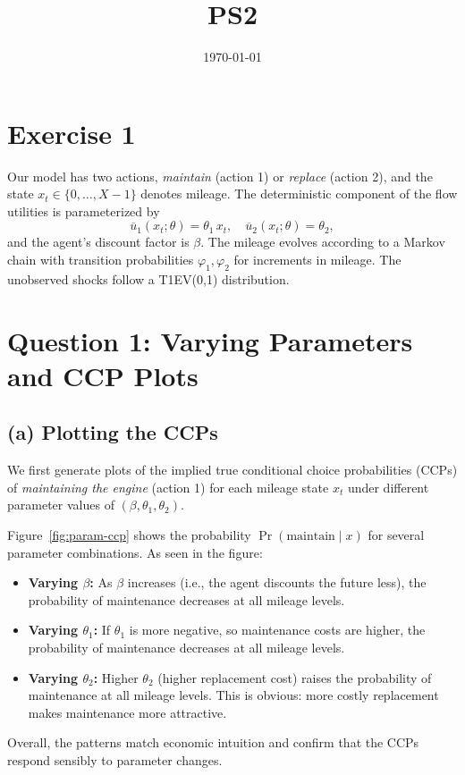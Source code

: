 \documentclass[12pt]{article}
\title{PS2}
\date{\today}
\begin{document}
\maketitle

\section{Exercise 1}
Our model has two actions, \emph{maintain} (action 1) or \emph{replace} (action 2), and the state $x_t \in \{0,\ldots,X-1\}$ denotes mileage. The deterministic component of the flow utilities is parameterized by
\[
\overline{u}_1(x_t;\theta) = \theta_1 \, x_t, 
\quad
\overline{u}_2(x_t;\theta) = \theta_2,
\]
and the agent’s discount factor is $\beta$. The mileage evolves according to a Markov chain with transition probabilities $\varphi_1,\varphi_2$ for increments in mileage. The unobserved shocks follow a T1EV(0,1) distribution.

\section{Question 1: Varying Parameters and CCP Plots}
\label{sec:Q1}
\subsection*{(a) Plotting the CCPs}
We first generate plots of the implied true conditional choice probabilities (CCPs) of \emph{maintaining the engine} (action 1) for each mileage state $x_t$ under different parameter values of $(\beta,\theta_1,\theta_2)$. 

Figure~\ref{fig:param-ccp} shows the probability $\Pr(\text{maintain}\mid x)$ for several parameter combinations. As seen in the figure:
\begin{itemize}
\item \textbf{Varying $\beta$:} As $\beta$ increases (i.e., the agent discounts the future less), the probability of maintenance decreases at all mileage levels. 
\item \textbf{Varying $\theta_1$:} If $\theta_1$ is more negative, so maintenance costs are higher, the probability of maintenance decreases at all mileage levels.
\item \textbf{Varying $\theta_2$:} Higher $\theta_2$ (higher replacement cost) raises the probability of maintenance at all mileage levels. This is obvious: more costly replacement makes maintenance more attractive.
\end{itemize}
Overall, the patterns match economic intuition and confirm that the CCPs respond sensibly to parameter changes.
\end{document}
